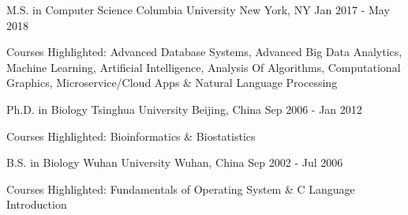 

\begin{cventries}

  \cventry
    {M.S. in Computer Science} %
    {Columbia University} %
    {New York, NY} %
    {Jan 2017 - May 2018} %
    {
      \begin{cvitems} %
        \item {
        	Courses Highlighted: 
	    	Advanced Database Systems, 
	    	Advanced Big Data Analytics, 
	    	Machine Learning, 
	    	Artificial Intelligence, 
	    	Analysis Of Algorithms, 
	    	Computational Graphics, 
	    	Microservice/Cloud Apps \&
	    	Natural Language Processing
    	}
      \end{cvitems}
    }


\cventry
{Ph.D. in Biology} %
{Tsinghua University} %
{Beijing, China} %
{Sep 2006 - Jan 2012} %
{
	\begin{cvitems} %
		\item {Courses Highlighted: Bioinformatics \& Biostatistics}
	\end{cvitems}
}


\cventry
{B.S. in Biology} %
{Wuhan University} %
{Wuhan, China} %
{Sep 2002 - Jul 2006} %
{
	\begin{cvitems} %
		\item {Courses Highlighted: Fundamentals of Operating System \& C Language Introduction}
	\end{cvitems}
}

\end{cventries}
